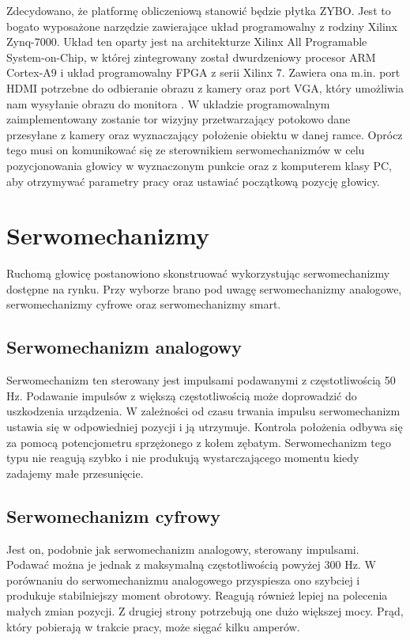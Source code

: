 Zdecydowano, że platformę obliczeniową stanowić będzie płytka ZYBO. Jest to bogato wyposażone narzędzie zawierające układ programowalny z rodziny Xilinx Zynq-7000. Układ ten oparty jest na architekturze Xilinx All Programable System-on-Chip, w której zintegrowany został dwurdzeniowy procesor ARM Cortex-A9 i układ programowalny FPGA z serii Xilinx 7. Zawiera ona m.in. port HDMI potrzebne do odbieranie obrazu z kamery oraz port VGA, który umożliwia nam wysyłanie obrazu do monitora \cite{Xi}. W układzie programowalnym zaimplementowany zostanie tor wizyjny przetwarzający potokowo dane przesyłane z kamery oraz wyznaczający położenie obiektu w danej ramce. Oprócz tego musi on komunikować się ze sterownikiem serwomechanizmów w celu pozycjonowania głowicy w wyznaczonym punkcie oraz z komputerem klasy PC, aby otrzymywać parametry pracy oraz ustawiać początkową pozycję głowicy.

\section{Serwomechanizmy}
\label{sec:serwomechanizmy}

Ruchomą głowicę postanowiono skonstruować wykorzystując serwomechanizmy dostępne na rynku. Przy wyborze brano pod uwagę serwomechanizmy analogowe, serwomechanizmy cyfrowe oraz serwomechanizmy smart.

\subsection{Serwomechanizm analogowy}
Serwomechanizm ten sterowany jest impulsami podawanymi z częstotliwością 50 Hz. Podawanie impulsów z większą częstotliwością może doprowadzić do uszkodzenia urządzenia. W zależności od czasu trwania impulsu serwomechanizm ustawia się w odpowiedniej pozycji i ją utrzymuje. Kontrola położenia odbywa się za pomocą potencjometru sprzężonego z kołem zębatym. Serwomechanizm tego typu nie reagują szybko i nie produkują wystarczającego momentu kiedy zadajemy małe przesunięcie.

\subsection{Serwomechanizm cyfrowy}
Jest on, podobnie jak serwomechanizm analogowy, sterowany impulsami. Podawać można je jednak z maksymalną częstotliwością powyżej 300 Hz. W porównaniu do serwomechanizmu analogowego przyspiesza ono szybciej i produkuje stabilniejszy moment obrotowy. Reagują również lepiej na polecenia małych zmian pozycji. Z drugiej strony  potrzebują one dużo większej mocy. Prąd, który pobierają w trakcie pracy, może sięgać kilku amperów.

